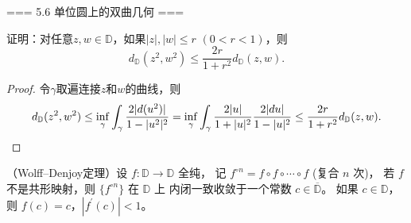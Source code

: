 === 5.6 单位圆上的双曲几何 ===
\begin{1}
    证明：对任意$z,w\in\mathbb{D}$，如果$|z|,|w|\le r$ $(0<r<1)$，则
    \[d_{\mathbb{D}}(z^2,w^2)\le\frac{2r}{1+r^2}d_{\mathbb{D}}(z,w).\]
\end{1}
\begin{proof}
    令$\gamma$取遍连接$z$和$w$的曲线，则
    \[d_{\mathbb{D}}(z^2,w^2)\le\inf_\gamma\int_\gamma\frac{2|d(u^2)|}{1-|u^2|^2}
    =\inf_\gamma\int_\gamma\frac{2|u|}{1+|u|^2}\frac{2|du|}{1-|u|^2}
    \le\frac{2r}{1+r^2}d_{\mathbb{D}}(z,w).\qedhere\]
\end{proof}
\begin{4}
    （Wolff--Denjoy定理）设 $f: \mathbb{D} \rightarrow \mathbb{D}$ 全纯，
    记 $f^{\circ n}= f \circ f \circ \cdots \circ f$ (复合 $n$ 次)，
    若 $f$ 不是共形映射，则 $\{f^{\circ n}\}$ 在 $\mathbb{D}$ 上
    内闭一致收敛于一个常数 $c \in \overline{\mathbb{D}}$。
    如果 $c \in \mathbb{D}$，则 $f(c)=c$，$|f^{\prime}(c)|<1$。
\end{4}
